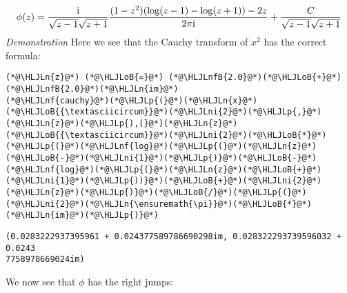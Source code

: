 \documentclass[12pt,a4paper]{article}
\newcommand{\HLJLn}[1]{#1}
\newcommand{\HLJLnf}[1]{\textcolor[RGB]{66,102,213}{#1}}
\newcommand{\HLJLnfB}[1]{\textcolor[RGB]{59,151,46}{#1}}
\newcommand{\HLJLni}[1]{\textcolor[RGB]{59,151,46}{#1}}
\newcommand{\HLJLoB}[1]{\textcolor[RGB]{102,102,102}{\textbf{#1}}}
\newcommand{\HLJLp}[1]{#1}
\def\I{ {\rm i} }
\begin{document}
\[
\phi(z) = {\I \over \sqrt{z - 1} \sqrt{z+1}} {(1-z^2)(\log(z-1) - \log(z+1)) - 2 z \over 2 \pi \I}  + {C \over \sqrt{z-1}\sqrt{z+1}}
\]
\emph{Demonstration} Here we see that the Cauchy transform of $x^2$ has the correct formula:


\begin{lstlisting}
(*@\HLJLn{z}@*) (*@\HLJLoB{=}@*) (*@\HLJLnfB{2.0}@*)(*@\HLJLoB{+}@*)(*@\HLJLnfB{2.0}@*)(*@\HLJLn{im}@*)
(*@\HLJLnf{cauchy}@*)(*@\HLJLp{(}@*)(*@\HLJLn{x}@*)(*@\HLJLoB{{\textasciicircum}}@*)(*@\HLJLni{2}@*)(*@\HLJLp{,}@*) (*@\HLJLn{z}@*)(*@\HLJLp{),(}@*)(*@\HLJLn{z}@*)(*@\HLJLoB{{\textasciicircum}}@*)(*@\HLJLni{2}@*)(*@\HLJLoB{*}@*)(*@\HLJLp{(}@*)(*@\HLJLnf{log}@*)(*@\HLJLp{(}@*)(*@\HLJLn{z}@*)(*@\HLJLoB{-}@*)(*@\HLJLni{1}@*)(*@\HLJLp{)}@*)(*@\HLJLoB{-}@*)(*@\HLJLnf{log}@*)(*@\HLJLp{(}@*)(*@\HLJLn{z}@*)(*@\HLJLoB{+}@*)(*@\HLJLni{1}@*)(*@\HLJLp{))}@*)(*@\HLJLoB{+}@*)(*@\HLJLni{2}@*)(*@\HLJLn{z}@*)(*@\HLJLp{)}@*)(*@\HLJLoB{/}@*)(*@\HLJLp{(}@*)(*@\HLJLni{2}@*)(*@\HLJLn{\ensuremath{\pi}}@*)(*@\HLJLoB{*}@*)(*@\HLJLn{im}@*)(*@\HLJLp{)}@*)
\end{lstlisting}

\begin{lstlisting}
(0.0283222937395961 + 0.024377589786690298im, 0.028322293739596032 + 0.0243
7758978669024im)
\end{lstlisting}


We now see that $\phi$ has the right jumps:
\end{document}
